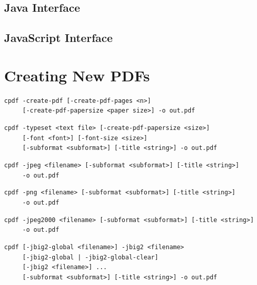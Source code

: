 \documentclass{book}
\begin{document}
\begin{jcpdflib}
\clearpage
\section*{Java Interface}
\begin{small}\tt

\end{small}
\end{jcpdflib}

\begin{jscpdflib}
\clearpage
\section*{JavaScript Interface}
\begin{small}\tt

\end{small}
\end{jscpdflib}

\clearpage\pagestyle{empty}
\chapter{Creating New PDFs}\label{chap:17}\pagestyle{fancy}

  {\small\begin{framed}
  \noindent\verb!cpdf -create-pdf [-create-pdf-pages <n>]!\\
  \noindent\verb!     [-create-pdf-papersize <paper size>] -o out.pdf!


  \vspace{1.5mm}
  \noindent\verb!cpdf -typeset <text file> [-create-pdf-papersize <size>]!\\
  \noindent\verb!     [-font <font>] [-font-size <size>]!\\
  \noindent\verb!     [-subformat <subformat>] [-title <string>] -o out.pdf!

  \vspace{1.5mm}
  \noindent\verb!cpdf -jpeg <filename> [-subformat <subformat>] [-title <string>]!\\
  \noindent\verb!     -o out.pdf!

  \vspace{1.5mm}
  \noindent\verb!cpdf -png <filename> [-subformat <subformat>] [-title <string>]!\\
  \noindent\verb!     -o out.pdf!

  \vspace{1.5mm}
  \noindent\verb!cpdf -jpeg2000 <filename> [-subformat <subformat>] [-title <string>]!\\
  \noindent\verb!     -o out.pdf!

  \vspace{1.5mm}
  \noindent\verb!cpdf [-jbig2-global <filename>] -jbig2 <filename>!\\
  \noindent\verb!     [-jbig2-global | -jbig2-global-clear]!\\
  \noindent\verb!     [-jbig2 <filename>] ...!\\
  \noindent\verb!     [-subformat <subformat>] [-title <string>] -o out.pdf!
  \end{framed}}
\end{document}
